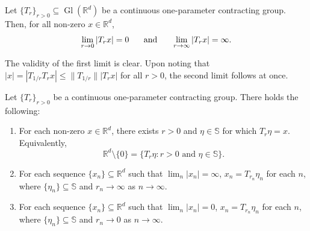 \documentclass[smallextended]{svjour3}
\theoremstyle{remark}
\renewenvironment{proof}[1][\proofname]{\renewcommand\xproofname{#1}\xproof}{\endxproof}
\newcommand\Gl{\operatorname{Gl}} %
\begin{document}
\begin{proposition}\label{prop:ContractingLimits}
Let $\{T_r\}_{r>0}\subseteq\Gl(\mathbb{R}^d)$ be a continuous one-parameter contracting group.  Then, for all non-zero $x\in\mathbb{R}^d$,
\begin{equation*}
\lim_{r\rightarrow 0}|T_r x|=0\hspace{.5cm}\mbox{ and }\hspace{.5cm}\lim_{r\rightarrow\infty}|T_r x|=\infty.
\end{equation*}
\end{proposition}
\begin{proof}
The validity of the first limit is clear. Upon noting that $|x|=|T_{1/r}T_rx|\leq \|T_{1/r}\||T_r x|$ for all $r>0$, the second limit follows at once.
\end{proof}
\begin{proposition}\label{prop:ScaleFromSphere}
Let $\{T_r\}_{r>0}$ be a continuous one-parameter contracting group. There holds the following:
\begin{enumerate}[label=(\alph*), ref=(\alph*)]
\item\label{item:ScaleFromSphere_1} For each non-zero $x\in \mathbb{R}^d$, there exists $r>0$ and $\eta\in \mathbb{S}$ for which $T_r\eta=x$. Equivalently,
\begin{equation*}
\mathbb{R}^d\setminus\{0\}=\{T_r\eta:r>0\mbox{ and }\eta\in \mathbb{S}\}.
\end{equation*}
\item\label{item:ScaleFromSphere_2} For each sequence $\{x_n\}\subseteq\mathbb{R}^d$ such that $\lim_n|x_n|=\infty$, $x_n=T_{r_n}\eta_n$ for each $n$, where $\{\eta_n\}\subseteq \mathbb{S}$ and $r_n\rightarrow\infty$ as $n\rightarrow\infty$.
\item\label{item:ScaleFromSphere_3} For each sequence $\{x_n\}\subseteq\mathbb{R}^d$ such that $\lim_n|x_n|=0$, $x_n=T_{r_n}\eta_n$ for each $n$, where $\{\eta_n\}\subseteq \mathbb{S}$ and $r_n\rightarrow 0$ as $n\rightarrow\infty$.
\end{enumerate}
\end{proposition}
\end{document}

